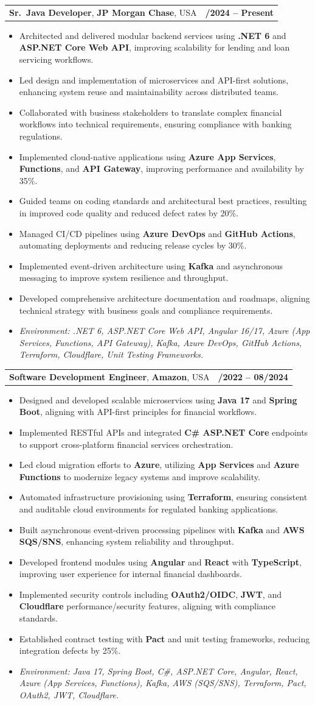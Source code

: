 \documentclass[letterpaper,11pt]{article}
\makeatletter
\newcommand{\resumeItem}[1]{
  \item\footnotesize{
    {#1 \vspace{-2pt}}
  }
}
\newcommand{\resumeSubheading}[4]{
  \vspace{-2pt}\item
    \begin{tabular*}{1.0\textwidth}[t]{l@{\extracolsep{\fill}}r}
      \textbf{\fontsize{10pt}{14pt}\selectfont #3}, \textbf{\fontsize{10pt}{14pt}\selectfont #1}, \fontsize{10pt}{14pt}\selectfont #4 & \textbf{\fontsize{10pt}{14pt}\selectfont #2} \\
    \end{tabular*}\vspace{-7pt}
}
\newcommand{\resumeItemListStart}{\begin{itemize}[leftmargin=*]}
\newcommand{\resumeItemListEnd}{\end{itemize}\vspace{-5pt}}
\makeatother
\begin{document}
\resumeSubheading
{JP Morgan Chase}{09/2024 -- Present}
{Sr.\ Java Developer}{USA}
\resumeItemListStart
  \resumeItem{Architected and delivered modular backend services using \textbf{.NET 6} and \textbf{ASP.NET Core Web API}, improving scalability for lending and loan servicing workflows.}
  \resumeItem{Led design and implementation of microservices and API-first solutions, enhancing system reuse and maintainability across distributed teams.}
  \resumeItem{Collaborated with business stakeholders to translate complex financial workflows into technical requirements, ensuring compliance with banking regulations.}
  \resumeItem{Implemented cloud-native applications using \textbf{Azure App Services}, \textbf{Functions}, and \textbf{API Gateway}, improving performance and availability by 35\%.}
  \resumeItem{Guided teams on coding standards and architectural best practices, resulting in improved code quality and reduced defect rates by 20\%.}
  \resumeItem{Managed CI/CD pipelines using \textbf{Azure DevOps} and \textbf{GitHub Actions}, automating deployments and reducing release cycles by 30\%.}
  \resumeItem{Implemented event-driven architecture using \textbf{Kafka} and asynchronous messaging to improve system resilience and throughput.}
  \resumeItem{Developed comprehensive architecture documentation and roadmaps, aligning technical strategy with business goals and compliance requirements.}
  \resumeItem{\textit{Environment: .NET 6, ASP.NET Core Web API, Angular 16/17, Azure (App Services, Functions, API Gateway), Kafka, Azure DevOps, GitHub Actions, Terraform, Cloudflare, Unit Testing Frameworks.}}
\resumeItemListEnd

\resumeSubheading
{Amazon}{10/2022 -- 08/2024}
{Software Development Engineer}{USA}
\resumeItemListStart
  \resumeItem{Designed and developed scalable microservices using \textbf{Java 17} and \textbf{Spring Boot}, aligning with API-first principles for financial workflows.}
  \resumeItem{Implemented RESTful APIs and integrated \textbf{C\# ASP.NET Core} endpoints to support cross-platform financial services orchestration.}
  \resumeItem{Led cloud migration efforts to \textbf{Azure}, utilizing \textbf{App Services} and \textbf{Azure Functions} to modernize legacy systems and improve scalability.}
  \resumeItem{Automated infrastructure provisioning using \textbf{Terraform}, ensuring consistent and auditable cloud environments for regulated banking applications.}
  \resumeItem{Built asynchronous event-driven processing pipelines with \textbf{Kafka} and \textbf{AWS SQS/SNS}, enhancing system reliability and throughput.}
  \resumeItem{Developed frontend modules using \textbf{Angular} and \textbf{React} with \textbf{TypeScript}, improving user experience for internal financial dashboards.}
  \resumeItem{Implemented security controls including \textbf{OAuth2/OIDC}, \textbf{JWT}, and \textbf{Cloudflare} performance/security features, aligning with compliance standards.}
  \resumeItem{Established contract testing with \textbf{Pact} and unit testing frameworks, reducing integration defects by 25\%.}
  \resumeItem{\textit{Environment: Java 17, Spring Boot, C\#, ASP.NET Core, Angular, React, Azure (App Services, Functions), Kafka, AWS (SQS/SNS), Terraform, Pact, OAuth2, JWT, Cloudflare.}}
\resumeItemListEnd
\end{document}
